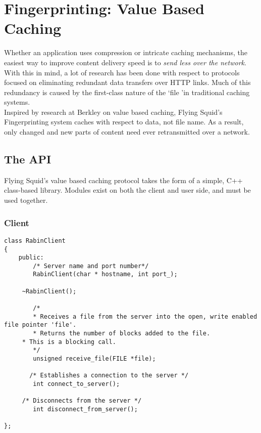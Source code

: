 \section{Fingerprinting: Value Based Caching}

 Whether an application uses compression or intricate caching mechanisms, the easiest way to improve content delivery speed is to \textit{send less over the network}. With this in mind, a lot of research has been done with respect to protocols focused on eliminating redundant data transfers over HTTP links. Much of this redundancy is caused by the first-class nature of the \lq file \rq in traditional caching systems.\\

\noindent
Inspired by research at Berkley on value based caching\cite{Rhea09}, Flying Squid's Fingerprinting system caches with respect to data, not file name. As a result, only changed and new parts of content need ever retransmitted over a network. 


\subsection{The API}

Flying Squid's value based caching protocol takes the form of a simple, C++ class-based library. Modules exist on both the client and user side, and must be used together.

\subsubsection{Client}

\begin{lstlisting}
class RabinClient
{
    public:
        /* Server name and port number*/
        RabinClient(char * hostname, int port_);
       
	 ~RabinClient();

        /*
        * Receives a file from the server into the open, write enabled file pointer 'file'.
        * Returns the number of blocks added to the file.
	 * This is a blocking call.
        */
        unsigned receive_file(FILE *file); 

       /* Establishes a connection to the server */
        int connect_to_server();

	 /* Disconnects from the server */
        int disconnect_from_server();

};

\end{lstlisting}

